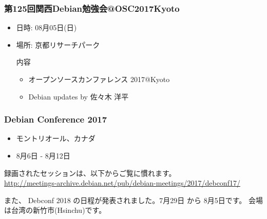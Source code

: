 \documentclass[cjk,dvipdfmx,12pt,compress,%
hyperref={bookmarks=true,bookmarksnumbered=true,bookmarksopen=false,%
colorlinks=false,%
pdftitle={第 120 回 関西 Debian 勉強会},%
pdfauthor={倉敷・のがた・佐々木・かわだ・おおつき},%
pdfsubject={資料},%
}]{beamer}
\begin{document}
\begin{frame}[fragile]
  \frametitle{第125回関西Debian勉強会@OSC2017Kyoto}
  \begin{itemize}
  \item 日時: 08月05日(日)
  \item 場所: 京都リサーチパーク
  \begin{block}{内容}
    \begin{itemize}
        \item{オープンソースカンファレンス 2017@Kyoto}
        \item{Debian updates by 佐々木 洋平}
    \end{itemize}
  \end{block}
\end{itemize}
\end{frame}


\begin{frame}[fragile]
  \frametitle{Debian Conference 2017}
  \begin{itemize}
    \item モントリオール、カナダ
    \item 8月6日 - 8月12日 
  \end{itemize}

録画されたセッションは、以下からご覧に慣れます。\\
\url{http://meetings-archive.debian.net/pub/debian-meetings/2017/debconf17/}

また、 Debconf 2018 の日程が発表されました。7月29日 から 8月5日です。
会場は台湾の新竹市(Hsinchu)です。

\end{frame}
\end{document}
